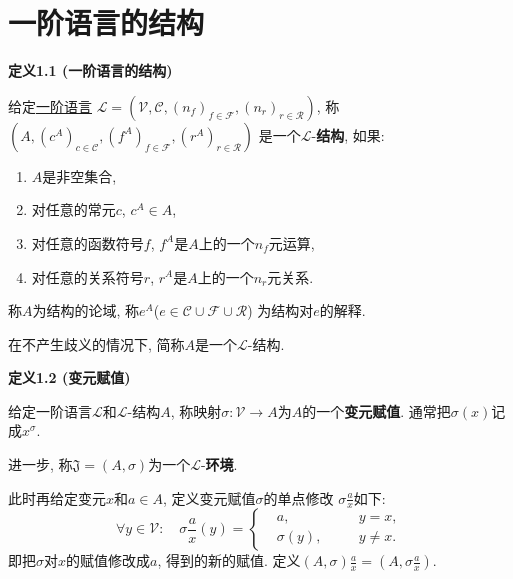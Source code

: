 \documentclass[UTF8]{ctexart}
\begin{document}
\setlength{\abovedisplayskip}{1pt}
\setlength{\belowdisplayskip}{1pt}

\section{一阶语言的结构}

\hypertarget{sec:定义1.1}{}
\noindent\textbf{定义1.1 (一阶语言的结构)}

给定\href{../../01 一阶语言/01 一阶语言#nameddest=sec:定义1.1}{一阶语言}
$\mathcal{L}=
(\mathcal{V},\mathcal{C},(n_f)_{f\in\mathcal{F}},(n_r)_{r\in\mathcal{R}})$,
称$(A,(c^A)_{c\in\mathcal{C}},(f^A)_{f\in\mathcal{F}},(r^A)_{r\in\mathcal{R}})$
是一个$\mathcal{L}$-\textbf{结构}, 如果:
\begin{enumerate}
    \item $A$是非空集合,
    \item 对任意的常元$c$, $c^A\in A$,
    \item 对任意的函数符号$f$, $f^A$是$A$上的一个$n_f$元运算,
    \item 对任意的关系符号$r$, $r^A$是$A$上的一个$n_r$元关系.
\end{enumerate}
称$A$为结构的论域, 称$e^A$($e\in\mathcal{C}\cup\mathcal{F}\cup\mathcal{R}$)
为结构对$e$的解释.

\vspace{10pt}

在不产生歧义的情况下, 简称$A$是一个$\mathcal{L}$-结构.

\vspace{10pt}

\hypertarget{sec:定义1.2}{}
\noindent\textbf{定义1.2 (变元赋值)}

给定一阶语言$\mathcal{L}$和$\mathcal{L}$-结构$A$,
称映射$\sigma:\mathcal{V}\to A$为$A$的一个\textbf{变元赋值}.
通常把$\sigma(x)$记成$x^{\sigma}$.

进一步, 称$\mathfrak{J}=(A,\sigma)$为一个$\mathcal{L}$-\textbf{环境}.

\vspace{10pt}

此时再给定变元$x$和$a\in A$, 定义变元赋值$\sigma$的单点修改
$\displaystyle\sigma\frac{a}{x}$如下:
\[\forall y\in\mathcal{V}:\quad\sigma\frac{a}{x}(y)=\left\{\begin{aligned}
    &a,\quad&&y=x,\\[-3pt]
    &\sigma(y),\quad&&y\neq x.
\end{aligned}\right.\]
即把$\sigma$对$x$的赋值修改成$a$, 得到的新的赋值. 定义$\displaystyle
(A,\sigma)\frac{a}{x}=\left(A,\sigma\frac{a}{x}\right)$.
\end{document}
